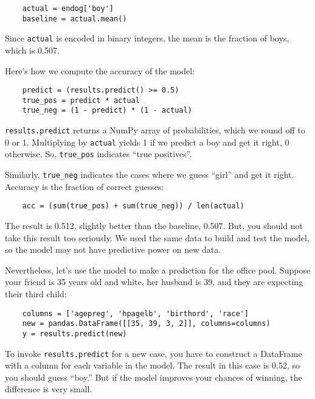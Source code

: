\begin{verbatim}
    actual = endog['boy']
    baseline = actual.mean()
\end{verbatim}

Since {\tt actual} is encoded in binary integers, the mean is the
fraction of boys, which is 0.507.

Here's how we compute the accuracy of the model:

\begin{verbatim}
    predict = (results.predict() >= 0.5)
    true_pos = predict * actual
    true_neg = (1 - predict) * (1 - actual)
\end{verbatim}

{\tt results.predict} returns a NumPy array of probabilities, which we
round off to 0 or 1.  Multiplying by {\tt actual}
yields 1 if we predict a boy and get it right, 0 otherwise.  So,
\verb"true_pos" indicates ``true positives''.

Similarly, \verb"true_neg" indicates the cases where we guess ``girl''
and get it right.  Accuracy is the fraction of correct guesses:

\begin{verbatim}
    acc = (sum(true_pos) + sum(true_neg)) / len(actual)
\end{verbatim}

The result is 0.512, slightly better than the
baseline, 0.507.  But, you should not take this result too seriously.
We used the same data to build and test the model, so the model
may not have predictive power on new data.

Nevertheless, let's use the model to make a prediction for the office
pool.  Suppose your friend is 35 years old and white,
her husband is 39, and they are expecting their third child:

\begin{verbatim}
    columns = ['agepreg', 'hpagelb', 'birthord', 'race']
    new = pandas.DataFrame([[35, 39, 3, 2]], columns=columns)
    y = results.predict(new)
\end{verbatim}

To invoke {\tt results.predict} for a new case, you have to construct
a DataFrame with a column for each variable in the model.  The result
in this case is 0.52, so you should guess ``boy.''  But if the model
improves your chances of winning, the difference is very small.



